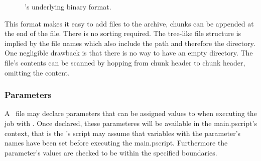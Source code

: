 \begin{figure}[h!]
\caption{\pjob's underlying binary format.}
\label{binary_format}
\end{figure}

This format makes it easy to add files to the archive,
chunks can be appended at the end of the file.
There is no sorting required.
The tree-like file structure is implied by the file names which also include the path
and therefore the directory.
One negligible drawback is that there is no way to have an empty directory.
The file's contents can be scanned by hopping from chunk header to chunk header,
omitting the content.

\subsubsection{Parameters}
\label{pjob:parameters}
A \pjob\ file may declare parameters that can be assigned values to when executing the job with \photoss.
Once declared, these parameteres will be available in the main.pscript's context,
that is the \pjob's script may assume that variables with the parameter's names
have been set before executing the main.pscript.
Furthermore the parameter's values are checked to be within the specified boundaries.

